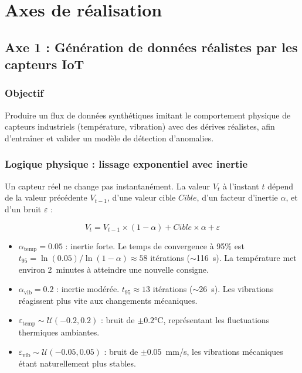 \documentclass[12pt,a4paper]{article}
\begin{document}
\newpage

\section{Axes de réalisation}

\subsection{Axe 1 : Génération de données réalistes par les capteurs IoT}

\subsubsection{Objectif}

Produire un flux de données synthétiques imitant le comportement physique de capteurs industriels (température, vibration) avec des dérives réalistes, afin d'entraîner et valider un modèle de détection d'anomalies.

\subsubsection{Logique physique : lissage exponentiel avec inertie}

Un capteur réel ne change pas instantanément. La valeur $V_t$ à l'instant $t$ dépend de la valeur précédente $V_{t-1}$, d'une valeur cible $Cible$, d'un facteur d'inertie $\alpha$, et d'un bruit $\varepsilon$ :

\[
V_t = V_{t-1} \times (1 - \alpha) + Cible \times \alpha + \varepsilon
\]

\begin{itemize}
    \item $\alpha_{\text{temp}} = 0.05$ : inertie forte. Le temps de convergence à 95\% est $t_{95} = \ln(0.05) / \ln(1 - \alpha) \approx 58$ itérations ($\sim$116~s). La température met environ 2~minutes à atteindre une nouvelle consigne.
    \item $\alpha_{\text{vib}} = 0.2$ : inertie modérée. $t_{95} \approx 13$ itérations ($\sim$26~s). Les vibrations réagissent plus vite aux changements mécaniques.
    \item $\varepsilon_{\text{temp}} \sim \mathcal{U}(-0.2, 0.2)$ : bruit de $\pm 0.2$°C, représentant les fluctuations thermiques ambiantes.
    \item $\varepsilon_{\text{vib}} \sim \mathcal{U}(-0.05, 0.05)$ : bruit de $\pm 0.05$~mm/s, les vibrations mécaniques étant naturellement plus stables.
\end{itemize}
\end{document}
